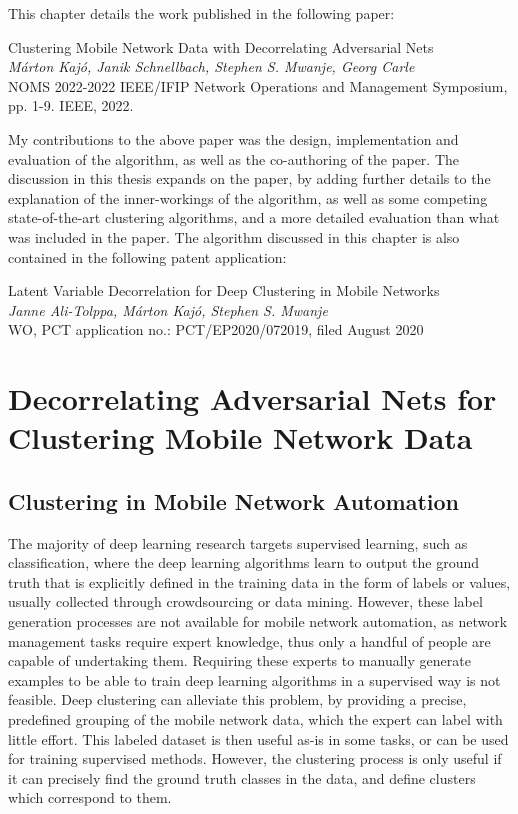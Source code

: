 	This chapter details the work published in the following paper:
	
	\begin{publication}
		Clustering Mobile Network Data with Decorrelating Adversarial Nets \\
		\textit{Márton Kajó, Janik Schnellbach, Stephen S. Mwanje, Georg Carle} \\
		NOMS 2022-2022 IEEE/IFIP Network Operations and Management Symposium, pp. 1-9. IEEE, 2022.
	\end{publication}

	My contributions to the above paper was the design, implementation and evaluation of the algorithm, as well as the co-authoring of the paper.
	The discussion in this thesis expands on the paper, by adding further details to the explanation of the inner-workings of the algorithm, as well as some competing state-of-the-art clustering algorithms, and a more detailed evaluation than what was included in the paper. 
	The algorithm discussed in this chapter is also contained in the following patent application:
	
	\begin{patent}
		Latent Variable Decorrelation for Deep Clustering in Mobile Networks \\
		\textit{Janne Ali-Tolppa, Márton Kajó, Stephen S. Mwanje} \\
		WO, PCT application no.: PCT/EP2020/072019, filed August 2020
	\end{patent}

	\section{Decorrelating Adversarial Nets for Clustering Mobile Network Data}
		\label{cha:decorr_ae:sec:decorr_ae}
		
		\subsection{Clustering in Mobile Network Automation}
			\label{cha:decorr_ae:sec:clust}
		
			The majority of deep learning research targets supervised learning, such as classification, where the deep learning algorithms learn to output the ground truth that is explicitly defined in the training data in the form of labels or values, usually collected through crowdsourcing or data mining.
			However, these label generation processes are not available for mobile network automation, as network management tasks require expert knowledge, thus only a handful of people are capable of undertaking them.
			Requiring these experts to manually generate examples to be able to train deep learning algorithms in a supervised way is not feasible.
			Deep clustering can alleviate this problem, by providing a precise, predefined grouping of the mobile network data, which the expert can label with little effort.
			This labeled dataset is then useful as-is in some tasks, or can be used for training supervised methods.
			However, the clustering process is only useful if it can precisely find the ground truth classes in the data, and define clusters which correspond to them.
			
